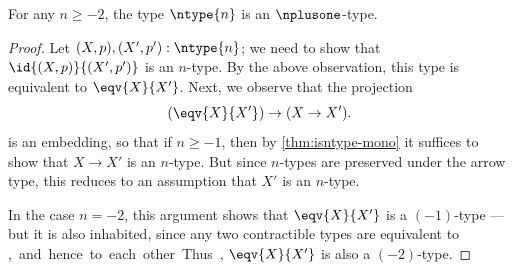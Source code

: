 %
\begin{thm}\label{thm:hleveln-of-hlevelSn}
 For any $n \geq -2$, the type $\ntype{n}$ is an $\nplusone$-type.
\end{thm}

\begin{proof}%
  Let $(X, p), (X', p') : \ntype{n}$; we need to show that $\id{(X, p)}{(X', p')}$ is an $n$-type.
  By the above observation, this type is equivalent to $\eqv{X}{X'}$.
  Next, we observe that the projection
  \[(\eqv{X}{X'}) \to (X \rightarrow X').\]
  is an embedding, so that if $n\geq -1$, then by \cref{thm:isntype-mono} it suffices to show that $X \rightarrow X'$ is an $n$-type.
  But since $n$-types are preserved under the arrow type, this reduces to an assumption that $X'$ is an $n$-type.

  In the case $n=-2$, this argument shows that $\eqv{X}{X'}$ is a $(-1)$-type --- but it is also inhabited, since any two contractible types
are equivalent to \unit, and hence to each other.
  Thus, $\eqv{X}{X'}$ is also a $(-2)$-type.
\end{proof}
